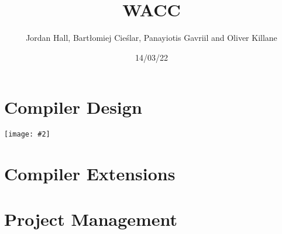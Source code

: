 \documentclass{article}
\title{WACC}
\author{Jordan Hall, Bartłomiej Cieślar, Panayiotis Gavriil and Oliver Killane}
\date{14/03/22}
\newcommand{\centerimage}[2]{\begin{center}
    \texttt{[image: \#2]}
\end{center}}
\begin{document}
    \maketitle

    \section*{Compiler Design}
    \centerimage{0.9}{Compiler Map}

    \section*{Compiler Extensions}
    
    \section*{Project Management}
\end{document}

